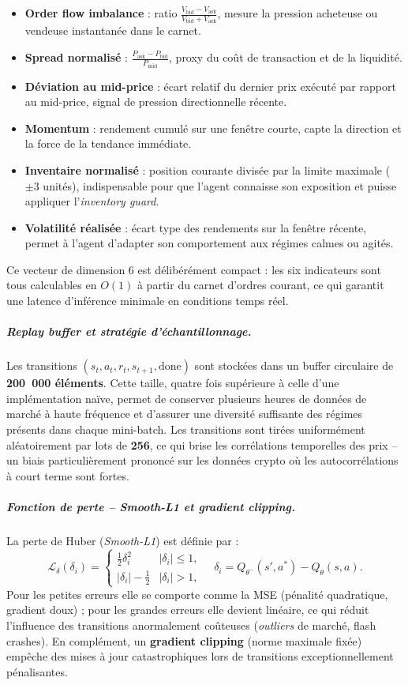 \documentclass[11pt,a4paper]{article}
\begin{document}
\begin{itemize}[leftmargin=1.2cm]
  \item \textbf{Order flow imbalance} : ratio
        $\frac{V_{\text{bid}} - V_{\text{ask}}}{V_{\text{bid}} +
        V_{\text{ask}}}$, mesure la pression acheteuse ou vendeuse
        instantanée dans le carnet.
  \item \textbf{Spread normalisé} :
        $\frac{P_{\text{ask}} - P_{\text{bid}}}{P_{\text{mid}}}$,
        proxy du coût de transaction et de la liquidité.
  \item \textbf{Déviation au mid-price} : écart relatif du dernier
        prix exécuté par rapport au mid-price, signal de pression
        directionnelle récente.
  \item \textbf{Momentum} : rendement cumulé sur une fenêtre
        courte, capte la direction et la force de la tendance
        immédiate.
  \item \textbf{Inventaire normalisé} : position courante divisée
        par la limite maximale ($\pm 3$ unités), indispensable pour
        que l'agent connaisse son exposition et puisse appliquer
        l'\textit{inventory guard}.
  \item \textbf{Volatilité réalisée} : écart type des rendements
        sur la fenêtre récente, permet à l'agent d'adapter son
        comportement aux régimes calmes ou agités.
\end{itemize}

Ce vecteur de dimension 6 est délibérément compact :
les six indicateurs sont tous calculables en $O(1)$ à partir du
carnet d'ordres courant, ce qui garantit une latence d'inférence
minimale en conditions temps réel.

\subparagraph{Replay buffer et stratégie d'échantillonnage.}
Les transitions $(s_t, a_t, r_t, s_{t+1}, \text{done})$ sont
stockées dans un buffer circulaire de \textbf{200~000 éléments}.
Cette taille, quatre fois supérieure à celle d'une implémentation
naïve, permet de conserver plusieurs heures de données de marché
à haute fréquence et d'assurer une diversité suffisante des
régimes présents dans chaque mini-batch. Les transitions sont
tirées uniformément aléatoirement par lots de \textbf{256}, ce
qui brise les corrélations temporelles des prix -- un biais
particulièrement prononcé sur les données crypto où les
autocorrélations à court terme sont fortes.

\subparagraph{Fonction de perte -- Smooth-L1 et gradient clipping.}
La perte de Huber (\textit{Smooth-L1}) est définie par :
\[
\mathcal{L}_\delta(\delta_i) =
\begin{cases}
\tfrac{1}{2}\delta_i^2 & |\delta_i| \le 1,\\
|\delta_i| - \tfrac{1}{2} & |\delta_i| > 1,
\end{cases}
\quad \delta_i = Q_{\theta^-}(s',a^*) - Q_\theta(s,a).
\]
Pour les petites erreurs elle se comporte comme la MSE (pénalité
quadratique, gradient doux) ; pour les grandes erreurs elle devient
linéaire, ce qui réduit l'influence des transitions anormalement
coûteuses (\textit{outliers} de marché, flash crashes). En
complément, un \textbf{gradient clipping} (norme maximale fixée)
empêche des mises à jour catastrophiques lors de transitions
exceptionnellement pénalisantes.
\end{document}
